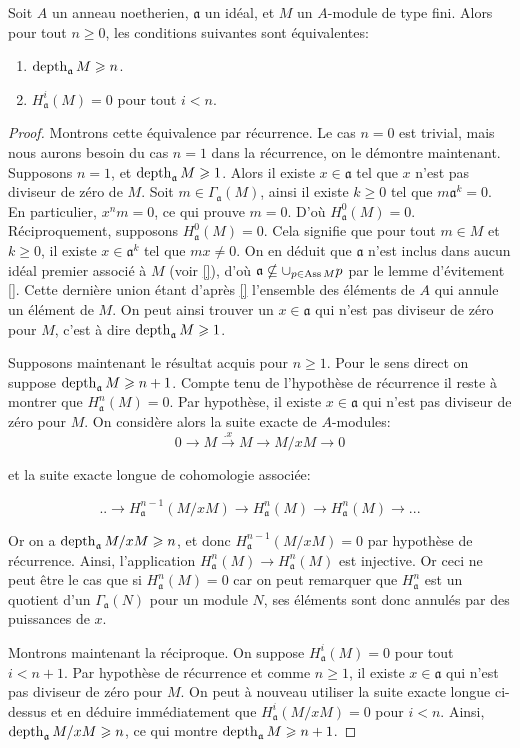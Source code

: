 \begin{prop}
Soit $A$ un anneau noetherien, $\mathfrak{a}$ un idéal, et $M$ un $A$-module de type fini. Alors pour tout $n\geq 0$, les conditions suivantes sont équivalentes:
\begin{enumerate}
\item $\operatorname{depth}_\mathfrak{a} M\geqslant n$.
\item $H_\mathfrak{a}^i(M)=0$ pour tout $i<n$.
\end{enumerate}
\end{prop}
\begin{proof}
Montrons cette équivalence par récurrence. Le cas $n=0$ est trivial, mais nous aurons besoin du cas $n=1$ dans la récurrence, on le démontre maintenant. Supposons $n=1$, et $\operatorname{depth}_\mathfrak{a} M\geqslant 1$. Alors il existe $x\in\mathfrak{a}$ tel que $x$ n'est pas diviseur de zéro de $M$. Soit $m\in \Gamma_ \mathfrak{a}(M)$, ainsi il existe $k\geq 0$ tel que $m \mathfrak{a}^k=0$. En particulier, $x^nm=0$, ce qui prouve $m=0$. D'où $H^0_\mathfrak{a}(M)=0$. Réciproquement, supposons $H^0_\mathfrak{a}(M)=0$. Cela signifie que pour tout $m\in M$ et $k\geq 0$, il existe $x\in \mathfrak{a}^k$ tel que $mx\neq 0$. On en déduit que $\mathfrak{a}$ n'est inclus dans aucun idéal premier associé à $M$ (voir \ref{}), d'où $\mathfrak{a}\nsubseteq \cup_{p\in \operatorname{Ass} M}p$ par le lemme d'évitement \ref{}. Cette dernière union étant d'après \ref{} l'ensemble des éléments de $A$ qui annule un élément de $M$. On peut ainsi trouver un $x\in \mathfrak{a}$ qui n'est pas diviseur de zéro pour $M$, c'est à dire $\operatorname{depth}_\mathfrak{a}M\geqslant 1$.

Supposons maintenant le résultat acquis pour $n\geq 1$. Pour le sens direct on suppose $\operatorname{depth}_\mathfrak{a} M\geqslant n+1$. Compte tenu de l'hypothèse de récurrence il reste à montrer que $H^n_\mathfrak{a}(M)=0$. Par hypothèse, il existe $x\in \mathfrak{a}$ qui n'est pas diviseur de zéro pour $M$. On considère alors la suite exacte de $A$-modules:
$$0\rightarrow M \xrightarrow{.x} M\rightarrow M/xM\rightarrow 0$$

\noindent et la suite exacte longue de cohomologie associée:

$$..\rightarrow H^{n-1}_\mathfrak{a}(M/xM) \rightarrow H^n_\mathfrak{a}(M) \rightarrow  H^n_\mathfrak{a}(M) \rightarrow ...$$

\noindent Or on a $\operatorname{depth}_\mathfrak{a} M/xM \geqslant n$, et donc $H^{n-1}_\mathfrak{a}(M/xM)=0$ par hypothèse de récurrence. Ainsi, l'application $H^n_\mathfrak{a}(M) \rightarrow  H^n_\mathfrak{a}(M)$ est injective. Or ceci ne peut être le cas que si $H^n_\mathfrak{a}(M)=0$ car on peut remarquer que $H^n_\mathfrak{a}$ est un quotient d'un $\Gamma_\mathfrak{a}(N)$ pour un module $N$, ses éléments sont donc annulés par des puissances de $x$. 

Montrons maintenant la réciproque. On suppose $H^i_\mathfrak{a}(M)=0$ pour tout $i<n+1$. Par hypothèse de récurrence et comme $n\geq 1$, il existe $x\in \mathfrak{a}$ qui n'est pas diviseur de zéro pour $M$. On peut à nouveau utiliser la suite exacte longue ci-dessus et en déduire immédiatement que $H^{i}_\mathfrak{a}(M/xM)=0$ pour $i<n$. Ainsi, $\operatorname{depth}_\mathfrak{a} M/xM\geqslant n$, ce qui montre $\operatorname{depth}_\mathfrak{a} M \geqslant n+1$.
\end{proof}

